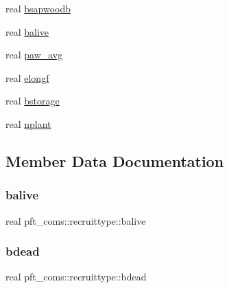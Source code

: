 \begin{DoxyCompactItemize}
\item 
real \hyperlink{structpft__coms_1_1recruittype_aa212a897e4e1741b1f0bbcc35a34a1bd}{bsapwoodb}
\item 
real \hyperlink{structpft__coms_1_1recruittype_ad4aba73ec3b526ea8c0e2ee5641cb988}{balive}
\item 
real \hyperlink{structpft__coms_1_1recruittype_a8c5c9e4dd1c79535ab5b03e8b5a5a981}{paw\+\_\+avg}
\item 
real \hyperlink{structpft__coms_1_1recruittype_ac83204f451c9483aa4a078453970602e}{elongf}
\item 
real \hyperlink{structpft__coms_1_1recruittype_af49417a4c10681ac32f8e4f0ee7a52b5}{bstorage}
\item 
real \hyperlink{structpft__coms_1_1recruittype_af6c130e8404bba50cc5d84f9d0619665}{nplant}
\end{DoxyCompactItemize}


\subsection{Member Data Documentation}
\mbox{\label{structpft__coms_1_1recruittype_ad4aba73ec3b526ea8c0e2ee5641cb988}} 
\subsubsection{\texorpdfstring{balive}{balive}}
{\footnotesize\ttfamily real pft\+\_\+coms\+::recruittype\+::balive}

\mbox{\label{structpft__coms_1_1recruittype_adbd20b6840a8ccdd160cd2ccea8dcca1}} 
\subsubsection{\texorpdfstring{bdead}{bdead}}
{\footnotesize\ttfamily real pft\+\_\+coms\+::recruittype\+::bdead}

\mbox{\label{structpft__coms_1_1recruittype_a9ad80c7a2b183b1bd3c799425f5641d0}} 
